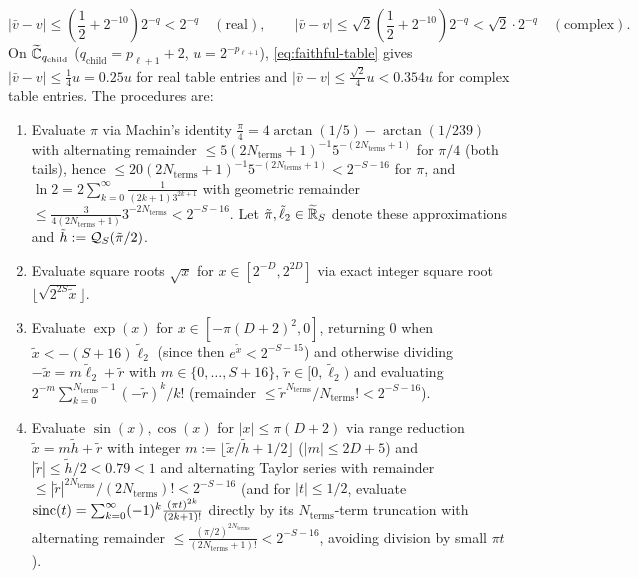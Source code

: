\begin{lemma}
\begin{equation}\label{eq:faithful-table}
  |\bar{v} - v| \le \left(\frac{1}{2} + 2^{-10}\right) 2^{-q} < 2^{-q} \quad (\text{real}), \qquad |\bar{v} - v| \le \sqrt{2}\left(\frac{1}{2} + 2^{-10}\right) 2^{-q} < \sqrt{2} \cdot 2^{-q} \quad (\text{complex}).
\end{equation}
On $\widetilde{\mathbb{C}}_{q_{\mathrm{child}}}$ ($q_{\mathrm{child}} = p_{\ell+1} + 2$, $u = 2^{-p_{\ell+1}}$), \eqref{eq:faithful-table} gives $|\bar{v} - v| \le \frac{1}{4} u = 0.25 u$ for real table entries and $|\bar{v} - v| \le \frac{\sqrt{2}}{4} u < 0.354 u$ for complex table entries. The procedures are:
\begin{enumerate}[label=(\roman*),leftmargin=*]
  \item Evaluate $\pi$ via Machin's identity $\frac{\pi}{4} = 4\arctan(1/5) - \arctan(1/239)$ with alternating remainder $\le 5(2N_{\mathrm{terms}}+1)^{-1}\allowbreak 5^{-(2N_{\mathrm{terms}}+1)}$ for $\pi/4$ (both tails), hence $\le 20(2N_{\mathrm{terms}}+1)^{-1}\allowbreak 5^{-(2N_{\mathrm{terms}}+1)} < 2^{-S-16}$ for $\pi$, and $\ln 2 = 2\sum_{k=0}^\infty \frac{1}{(2k+1)3^{2k+1}}$ with geometric remainder $\le \frac{3}{4(2N_{\mathrm{terms}}+1)} 3^{-2N_{\mathrm{terms}}} < 2^{-S-16}$. Let $\tilde{\pi}, \tilde{\ell}_2 \in \widetilde{\mathbb{R}}_S$ denote these approximations and $\tilde{h} := \mathcal{Q}_S(\tilde{\pi}/2)$.
  \item Evaluate square roots $\sqrt{x}$ for $x \in [2^{-D}, 2^{2D}]$ via exact integer square root $\lfloor \sqrt{2^{2S} \tilde{x}} \rfloor$.
  \item Evaluate $\exp(x)$ for $x \in [-\pi (D + 2)^2, 0]$, returning $0$ when $\tilde{x} < -(S + 16)\tilde{\ell}_2$ (since then $e^{\tilde{x}} < 2^{-S-15}$) and otherwise dividing $-\tilde{x} = m \tilde{\ell}_2 + \tilde{r}$ with $m \in \{0, \dots, S + 16\}$, $\tilde{r} \in [0, \tilde{\ell}_2)$ and evaluating $2^{-m}\sum_{k=0}^{N_{\mathrm{terms}}-1} (-\tilde{r})^k / k!$ (remainder $\le \tilde{r}^{N_{\mathrm{terms}}} / N_{\mathrm{terms}}! < 2^{-S-16}$).
  \item Evaluate $\sin(x), \cos(x)$ for $|x| \le \pi(D + 2)$ via range reduction $\tilde{x} = m \tilde{h} + \tilde{r}$ with integer $m := \lfloor \tilde{x}/\tilde{h} + 1/2 \rfloor$ ($|m| \le 2D + 5$) and $|\tilde{r}| \le \tilde{h}/2 < 0.79 < 1$ and alternating Taylor series with remainder $\le |\tilde{r}|^{2N_{\mathrm{terms}}} / (2N_{\mathrm{terms}})! < 2^{-S-16}$ (and for $|t| \le 1/2$, evaluate $\operatorname{sinc}(t) = \sum_{k=0}^\infty (-1)^k \frac{(\pi t)^{2k}}{(2k+1)!}$ directly by its $N_{\mathrm{terms}}$-term truncation with alternating remainder $\le \frac{(\pi/2)^{2N_{\mathrm{terms}}}}{(2N_{\mathrm{terms}}+1)!} < 2^{-S-16}$, avoiding division by small $\pi t$).

\end{enumerate}
\end{lemma}
